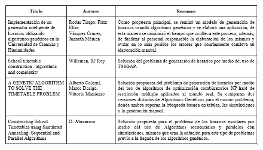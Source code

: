 \begin{itemize}
		\begin{figure}[htbp!]
			\begin{center}
				\includegraphics[width=1.05\textwidth]{images/entornoTT/estadoArteTesis.png}
				
			\end{center}
		\end{figure}
	\end{itemize}
		

%		
%		
%			
%			
	
	


	
	
	
	